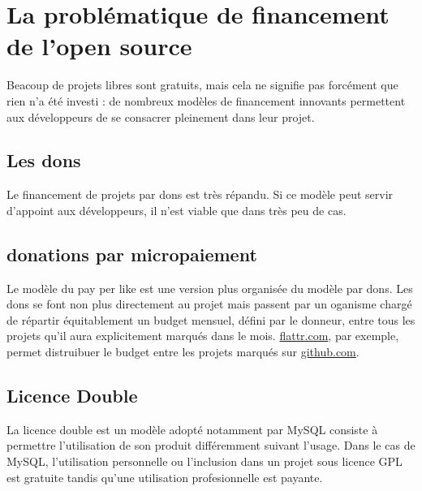 \chapter{La problématique de financement de l'open source}

Beacoup de projets libres sont gratuits, mais cela ne signifie pas forcément que
rien n'a été investi : de nombreux modèles de financement innovants permettent
aux développeurs de se consacrer pleinement dans leur projet.

    \section{Les dons}

Le financement de projets par dons est très répandu.
Si ce modèle peut servir d'appoint aux développeurs, il n'est viable que dans
très peu de cas.
    
    \section{donations par micropaiement}

Le modèle du pay per like est une version plus organisée du modèle par dons. Les
dons se font non plus directement au projet mais passent par un oganisme chargé
de répartir équitablement un budget mensuel, défini par le donneur, entre tous
les projets qu'il aura explicitement marqués dans le mois.
\url{flattr.com}, par exemple, permet distruibuer le budget entre les projets
marqués sur \url{github.com}.

    \section{Licence Double}

La licence double est un modèle adopté notamment par MySQL consiste à permettre
l'utilisation de son produit différemment suivant l'usage. Dans le cas de MySQL,
l'utilisation personnelle ou l'inclusion dans un projet sous licence GPL est
gratuite tandis qu'une utilisation profesionnelle est payante.

\paragraph{}
